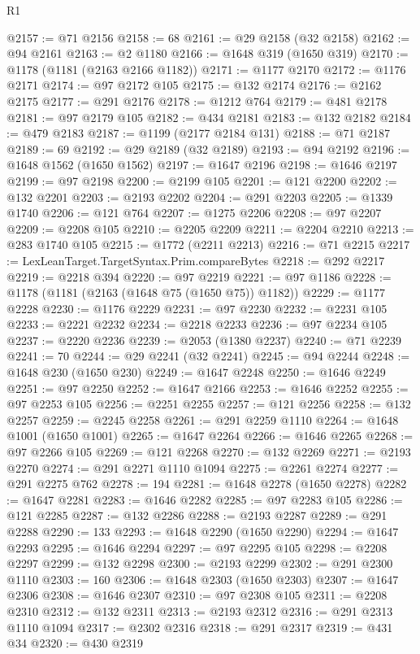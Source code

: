 \begin{lexlean}{R1}
\begin{coremodule}
{{{{{{{{{{{{{{{{{{{{{{{{{{{{{{{{{{{{{{{{{{{{{{{{{{{{{{{{{{{{{{{{{{{{{{{{{{{{{{{{{{{{{{{{{{{{{{{{{{{{{{{{{{{{{{{{{{{{{{{{{{{{{{{{{{{{{{{{{{{{{{{{{{{{{{{{{{{{{{{{{{{{{{{{{{{{{{{{{{{{{{{{{{@2157 := @71 @2156
@2158 := 68
@2161 := @29 @2158 (@32 @2158)
@2162 := @94 @2161
@2163 := @2 @1180
@2166 := @1648 @319 (@1650 @319)
@2170 := @1178 (@1181 (@2163 @2166 @1182))
@2171 := @1177 @2170
@2172 := @1176 @2171
@2174 := @97 @2172 @105
@2175 := @132 @2174
@2176 := @2162 @2175
@2177 := @291 @2176
@2178 := @1212 @764
@2179 := @481 @2178
@2181 := @97 @2179 @105
@2182 := @434 @2181
@2183 := @132 @2182
@2184 := @479 @2183
@2187 := @1199 (@2177 @2184 @131)
@2188 := @71 @2187
@2189 := 69
@2192 := @29 @2189 (@32 @2189)
@2193 := @94 @2192
@2196 := @1648 @1562 (@1650 @1562)
@2197 := @1647 @2196
@2198 := @1646 @2197
@2199 := @97 @2198
@2200 := @2199 @105
@2201 := @121 @2200
@2202 := @132 @2201
@2203 := @2193 @2202
@2204 := @291 @2203
@2205 := @1339 @1740
@2206 := @121 @764
@2207 := @1275 @2206
@2208 := @97 @2207
@2209 := @2208 @105
@2210 := @2205 @2209
@2211 := @2204 @2210
@2213 := @283 @1740 @105
@2215 := @1772 (@2211 @2213)
@2216 := @71 @2215
@2217 := LexLeanTarget.TargetSyntax.Prim.compareBytes
@2218 := @292 @2217
@2219 := @2218 @394
@2220 := @97 @2219
@2221 := @97 @1186
@2228 := @1178 (@1181 (@2163 (@1648 @75 (@1650 @75)) @1182))
@2229 := @1177 @2228
@2230 := @1176 @2229
@2231 := @97 @2230
@2232 := @2231 @105
@2233 := @2221 @2232
@2234 := @2218 @2233
@2236 := @97 @2234 @105
@2237 := @2220 @2236
@2239 := @2053 (@1380 @2237)
@2240 := @71 @2239
@2241 := 70
@2244 := @29 @2241 (@32 @2241)
@2245 := @94 @2244
@2248 := @1648 @230 (@1650 @230)
@2249 := @1647 @2248
@2250 := @1646 @2249
@2251 := @97 @2250
@2252 := @1647 @2166
@2253 := @1646 @2252
@2255 := @97 @2253 @105
@2256 := @2251 @2255
@2257 := @121 @2256
@2258 := @132 @2257
@2259 := @2245 @2258
@2261 := @291 @2259 @1110
@2264 := @1648 @1001 (@1650 @1001)
@2265 := @1647 @2264
@2266 := @1646 @2265
@2268 := @97 @2266 @105
@2269 := @121 @2268
@2270 := @132 @2269
@2271 := @2193 @2270
@2274 := @291 @2271 @1110 @1094
@2275 := @2261 @2274
@2277 := @291 @2275 @762
@2278 := 194
@2281 := @1648 @2278 (@1650 @2278)
@2282 := @1647 @2281
@2283 := @1646 @2282
@2285 := @97 @2283 @105
@2286 := @121 @2285
@2287 := @132 @2286
@2288 := @2193 @2287
@2289 := @291 @2288
@2290 := 133
@2293 := @1648 @2290 (@1650 @2290)
@2294 := @1647 @2293
@2295 := @1646 @2294
@2297 := @97 @2295 @105
@2298 := @2208 @2297
@2299 := @132 @2298
@2300 := @2193 @2299
@2302 := @291 @2300 @1110
@2303 := 160
@2306 := @1648 @2303 (@1650 @2303)
@2307 := @1647 @2306
@2308 := @1646 @2307
@2310 := @97 @2308 @105
@2311 := @2208 @2310
@2312 := @132 @2311
@2313 := @2193 @2312
@2316 := @291 @2313 @1110 @1094
@2317 := @2302 @2316
@2318 := @291 @2317
@2319 := @431 @34
@2320 := @430 @2319
}}}}}}}}}}}}}}}}}}}}}}}}}}}}}}}}}}}}}}}}}}}}}}}}}}}}}}}}}}}}}}}}}}}}}}}}}}}}}}}}}}}}}}}}}}}}}}}}}}}}}}}}}}}}}}}}}}}}}}}}}}}}}}}}}}}}}}}}}}}}}}}}}}}}}}}}}}}}}}}}}}}}}}}}}}}}}}}}}}}}}}}}}}
\end{coremodule}
\end{lexlean}
